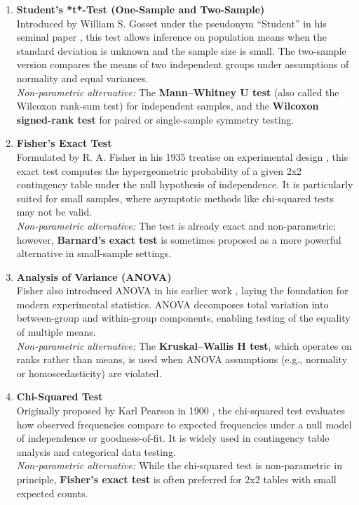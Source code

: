 \documentclass{book}
\begin{document}
\begin{enumerate}

\item \textbf{Student’s *t*-Test (One-Sample and Two-Sample)}\\
Introduced by William S. Gosset under the pseudonym “Student” in his seminal paper \cite{student1908}, this test allows inference on population means when the standard deviation is unknown and the sample size is small. The two-sample version compares the means of two independent groups under assumptions of normality and equal variances.\\
\textit{Non-parametric alternative:} The \textbf{Mann–Whitney U test} (also called the Wilcoxon rank-sum test) for independent samples, and the \textbf{Wilcoxon signed-rank test} for paired or single-sample symmetry testing.

\item \textbf{Fisher’s Exact Test}\\
Formulated by R. A. Fisher in his 1935 treatise on experimental design \cite{fisher1935}, this exact test computes the hypergeometric probability of a given 2x2 contingency table under the null hypothesis of independence. It is particularly suited for small samples, where asymptotic methods like chi-squared tests may not be valid.\\
\textit{Non-parametric alternative:} The test is already exact and non-parametric; however, \textbf{Barnard’s exact test} is sometimes proposed as a more powerful alternative in small-sample settings.

\item \textbf{Analysis of Variance (ANOVA)}\\
Fisher also introduced ANOVA in his earlier work \cite{fisher1925}, laying the foundation for modern experimental statistics. ANOVA decomposes total variation into between-group and within-group components, enabling testing of the equality of multiple means.\\
\textit{Non-parametric alternative:} The \textbf{Kruskal–Wallis H test}, which operates on ranks rather than means, is used when ANOVA assumptions (e.g., normality or homoscedasticity) are violated.

\item \textbf{Chi-Squared Test}\\
Originally proposed by Karl Pearson in 1900 \cite{pearson1900}, the chi-squared test evaluates how observed frequencies compare to expected frequencies under a null model of independence or goodness-of-fit. It is widely used in contingency table analysis and categorical data testing.\\
\textit{Non-parametric alternative:} While the chi-squared test is non-parametric in principle, \textbf{Fisher’s exact test} is often preferred for 2x2 tables with small expected counts.


\end{enumerate}
\end{document}
